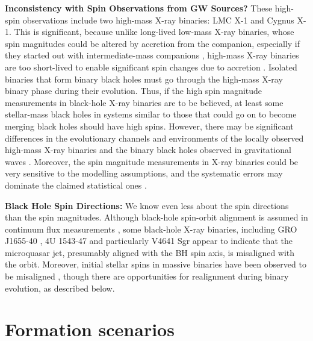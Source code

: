 \documentclass[iop,onecolumn]{revtex4}
\begin{document}
\textbf{Inconsistency with Spin Observations from GW Sources?} These high-spin observations include two high-mass X-ray binaries: LMC X-1 and Cygnus X-1.  This is significant, because unlike long-lived low-mass X-ray binaries, whose spin magnitudes could be altered by accretion from the companion, especially if they started out with intermediate-mass companions \citep{Podsiadlowski:2003,Fragos:2015}, high-mass X-ray binaries are too short-lived to enable significant spin changes due to accretion \citep{KingKolb:1999}.  %
Isolated binaries that form binary black holes must go through the high-mass X-ray binary phase during their evolution.  Thus, if the high spin magnitude measurements in black-hole X-ray binaries are to be believed, at least some stellar-mass black holes in systems similar to those that could go on to become merging black holes should have high spins.  However, there may be significant differences in the evolutionary channels and environments of the locally observed high-mass X-ray binaries and the binary black holes observed in gravitational waves \citep{HotokezakaPiran:2017}.  Moreover, the spin magnitude measurements in X-ray binaries could be very sensitive to the modelling assumptions, and the systematic errors may dominate the claimed statistical ones \citep[e.g.,][]{Basak:2017,Kawano:2017}.

\textbf{Black Hole Spin Directions:} We know even less about the spin directions than the spin magnitudes.  Although black-hole spin-orbit alignment is assumed in continuum flux measurements \citep{MillerMiller:2015}, some black-hole X-ray binaries, including GRO J1655-40 \citep{Martin:2008}, 4U 1543-47 \citep{MorningstarMiller:2014} and particularly V4641 Sgr \citep{Orosz:2001,Martin:2008b} appear to indicate that the microquasar jet, presumably aligned with the BH spin axis, is misaligned with the orbit.  Moreover, initial stellar spins in massive binaries have been observed to be misaligned \citep[e.g.,][]{Albrecht:2009,Albrecht:2014}, though there are opportunities for realignment during binary evolution, as described below.

\section{Formation scenarios}\label{form}
\end{document}
